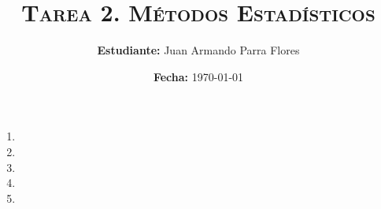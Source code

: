 \documentclass[11pt]{article}
\title{
    \textsc{
        \textbf{Tarea 2.} Métodos Estadísticos
    }
}
\author{
    \textbf{Estudiante:} Juan Armando Parra Flores
}
\date{
    \textbf{Fecha:} \today
}
\begin{document}
    \maketitle

    \begin{enumerate}
        \item
            
        \item
            
        \item
            
        \item
            
        \item
            
    \end{enumerate}

\end{document}
